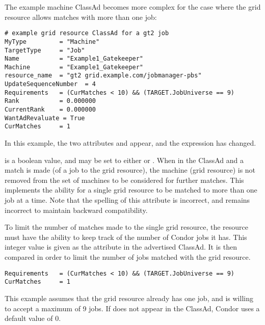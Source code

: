 The example machine ClassAd becomes more complex
for the case where the grid resource allows matches with more
than one job:
\footnotesize
\begin{verbatim}
# example grid resource ClassAd for a gt2 job
MyType         = "Machine"
TargetType     = "Job"
Name           = "Example1_Gatekeeper"
Machine        = "Example1_Gatekeeper"
resource_name  = "gt2 grid.example.com/jobmanager-pbs"
UpdateSequenceNumber  = 4
Requirements   = (CurMatches < 10) && (TARGET.JobUniverse == 9)
Rank           = 0.000000
CurrentRank    = 0.000000
WantAdRevaluate = True
CurMatches     = 1
\end{verbatim}
\normalsize

In this example, the two attributes 
and  appear, and the 
expression has changed.

 is a boolean value, and may be set to
either  or .
When  in the ClassAd and a match is made (of a job
to the grid resource), the machine (grid resource)
is not removed from the set of machines to be considered for
further matches.
This implements the ability for a single grid resource to
be matched to more than one job at a time.
Note that the spelling of this attribute is incorrect,
and remains incorrect to maintain backward compatibility.

To limit the number of matches made to the single grid resource,
the resource must have the ability to keep track of the number 
of Condor jobs it has.
This integer value is given as the  attribute
in the advertised ClassAd.
It is then compared in order to limit the number of jobs matched
with the grid resource.
\footnotesize
\begin{verbatim}
Requirements   = (CurMatches < 10) && (TARGET.JobUniverse == 9)
CurMatches     = 1
\end{verbatim}
\normalsize

This example assumes that the grid resource already has
one job, and is willing to accept a maximum of 9 jobs.
If  does not appear in the ClassAd,
Condor uses a default value of 0.


